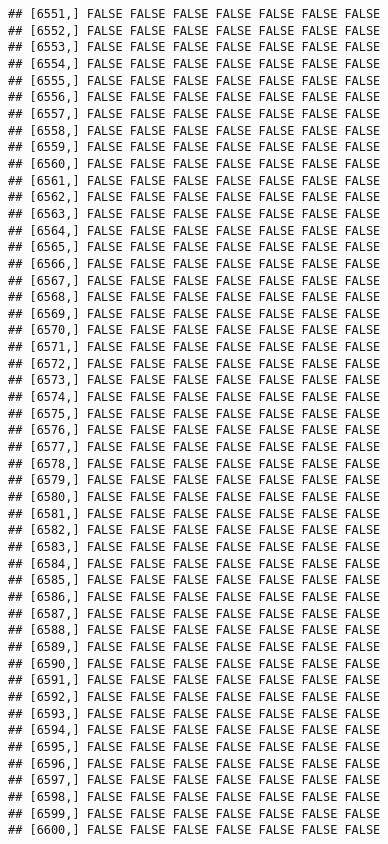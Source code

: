 \documentclass[
]{article}
\begin{document}
\begin{verbatim}
## [6551,] FALSE FALSE FALSE FALSE FALSE FALSE FALSE
## [6552,] FALSE FALSE FALSE FALSE FALSE FALSE FALSE
## [6553,] FALSE FALSE FALSE FALSE FALSE FALSE FALSE
## [6554,] FALSE FALSE FALSE FALSE FALSE FALSE FALSE
## [6555,] FALSE FALSE FALSE FALSE FALSE FALSE FALSE
## [6556,] FALSE FALSE FALSE FALSE FALSE FALSE FALSE
## [6557,] FALSE FALSE FALSE FALSE FALSE FALSE FALSE
## [6558,] FALSE FALSE FALSE FALSE FALSE FALSE FALSE
## [6559,] FALSE FALSE FALSE FALSE FALSE FALSE FALSE
## [6560,] FALSE FALSE FALSE FALSE FALSE FALSE FALSE
## [6561,] FALSE FALSE FALSE FALSE FALSE FALSE FALSE
## [6562,] FALSE FALSE FALSE FALSE FALSE FALSE FALSE
## [6563,] FALSE FALSE FALSE FALSE FALSE FALSE FALSE
## [6564,] FALSE FALSE FALSE FALSE FALSE FALSE FALSE
## [6565,] FALSE FALSE FALSE FALSE FALSE FALSE FALSE
## [6566,] FALSE FALSE FALSE FALSE FALSE FALSE FALSE
## [6567,] FALSE FALSE FALSE FALSE FALSE FALSE FALSE
## [6568,] FALSE FALSE FALSE FALSE FALSE FALSE FALSE
## [6569,] FALSE FALSE FALSE FALSE FALSE FALSE FALSE
## [6570,] FALSE FALSE FALSE FALSE FALSE FALSE FALSE
## [6571,] FALSE FALSE FALSE FALSE FALSE FALSE FALSE
## [6572,] FALSE FALSE FALSE FALSE FALSE FALSE FALSE
## [6573,] FALSE FALSE FALSE FALSE FALSE FALSE FALSE
## [6574,] FALSE FALSE FALSE FALSE FALSE FALSE FALSE
## [6575,] FALSE FALSE FALSE FALSE FALSE FALSE FALSE
## [6576,] FALSE FALSE FALSE FALSE FALSE FALSE FALSE
## [6577,] FALSE FALSE FALSE FALSE FALSE FALSE FALSE
## [6578,] FALSE FALSE FALSE FALSE FALSE FALSE FALSE
## [6579,] FALSE FALSE FALSE FALSE FALSE FALSE FALSE
## [6580,] FALSE FALSE FALSE FALSE FALSE FALSE FALSE
## [6581,] FALSE FALSE FALSE FALSE FALSE FALSE FALSE
## [6582,] FALSE FALSE FALSE FALSE FALSE FALSE FALSE
## [6583,] FALSE FALSE FALSE FALSE FALSE FALSE FALSE
## [6584,] FALSE FALSE FALSE FALSE FALSE FALSE FALSE
## [6585,] FALSE FALSE FALSE FALSE FALSE FALSE FALSE
## [6586,] FALSE FALSE FALSE FALSE FALSE FALSE FALSE
## [6587,] FALSE FALSE FALSE FALSE FALSE FALSE FALSE
## [6588,] FALSE FALSE FALSE FALSE FALSE FALSE FALSE
## [6589,] FALSE FALSE FALSE FALSE FALSE FALSE FALSE
## [6590,] FALSE FALSE FALSE FALSE FALSE FALSE FALSE
## [6591,] FALSE FALSE FALSE FALSE FALSE FALSE FALSE
## [6592,] FALSE FALSE FALSE FALSE FALSE FALSE FALSE
## [6593,] FALSE FALSE FALSE FALSE FALSE FALSE FALSE
## [6594,] FALSE FALSE FALSE FALSE FALSE FALSE FALSE
## [6595,] FALSE FALSE FALSE FALSE FALSE FALSE FALSE
## [6596,] FALSE FALSE FALSE FALSE FALSE FALSE FALSE
## [6597,] FALSE FALSE FALSE FALSE FALSE FALSE FALSE
## [6598,] FALSE FALSE FALSE FALSE FALSE FALSE FALSE
## [6599,] FALSE FALSE FALSE FALSE FALSE FALSE FALSE
## [6600,] FALSE FALSE FALSE FALSE FALSE FALSE FALSE

\end{verbatim}
\end{document}
